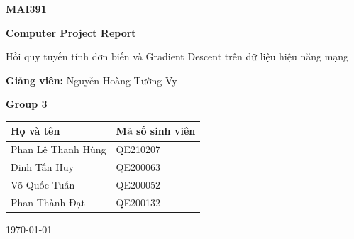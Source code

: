 \documentclass[12pt,a4paper]{article}
\begin{document}
\begin{titlepage}
    \centering

    \vspace*{1.5cm}

    {\Large\bfseries MAI391\par}

    \vspace{1.5cm}

    {\Huge\bfseries Computer Project Report\par}

    \vspace{1cm}

    {\Large
    Hồi quy tuyến tính đơn biến và Gradient Descent
    trên dữ liệu hiệu năng mạng
    \par}

    \vspace{1.5cm}

    {\large
    \textbf{Giảng viên:} Nguyễn Hoàng Tường Vy
    \par}

    \vspace{0.8cm}

    {\Large\bfseries Group 3\par}

    \vspace{0.5cm}

    \begin{tabular}{ll}
        \toprule
        \textbf{Họ và tên} & \textbf{Mã số sinh viên} \\
        \midrule
        Phan Lê Thanh Hùng & QE210207 \\
        Đinh Tấn Huy      & QE200063 \\
        Võ Quốc Tuấn      & QE200052 \\
        Phan Thành Đạt    & QE200132  \\
        \bottomrule
    \end{tabular}

    \vfill

    {\large \today\par}
\end{titlepage}

\tableofcontents
\clearpage
\end{document}
